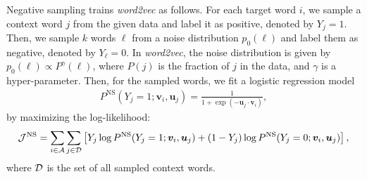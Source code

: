 \documentclass[12pt,draft,a4paper]{article}
\newcommand{\vect}[1]{\boldsymbol{#1}}
\begin{document}
Negative sampling trains {\it word2vec} as follows.
For each target word $i$, we sample a context word $j$ from the given data and label it as positive, denoted by $Y_{j}=1$.
Then, we sample $k$ words $\ell$ from a noise distribution $p_0(\ell)$ and label them as negative, denoted by $Y_{\ell}=0$.
In \textit{word2vec}, the noise distribution is given by $p_0(\ell) \propto P^\gamma (\ell)$, where $P(j)$ is the fraction of $j$ in the data, and $\gamma$ is a hyper-parameter.
Then, for the sampled words, we fit a logistic regression model
\begin{align}
	\label{eq:logistic-regress}
	P^{\text{NS}}(Y_{j} = 1; \vect{v}_{i}, \vect{u}_j) = \frac{1}{1 + \exp(-\vect{u}_j \cdot \vect{v}_{i})},
\end{align}
by maximizing the log-likelihood:
\begin{align}
	\label{eq:log-likelihood-logistic-regress}
	{\cal J}^{\text{NS}} = \sum_{i \in {\cal A}} \sum_{j \in {\cal D}} \left[ Y_{j} \log P^{\text{NS}}(Y_{j} = 1; \vect{v}_{i}, \vect{u}_j) + (1-Y_{j}) \log P^{\text{NS}}(Y_{j} = 0; \vect{v}_{i}, \vect{u}_j)\right],
\end{align}
where ${\cal D}$ is the set of all sampled context words.
\end{document}

